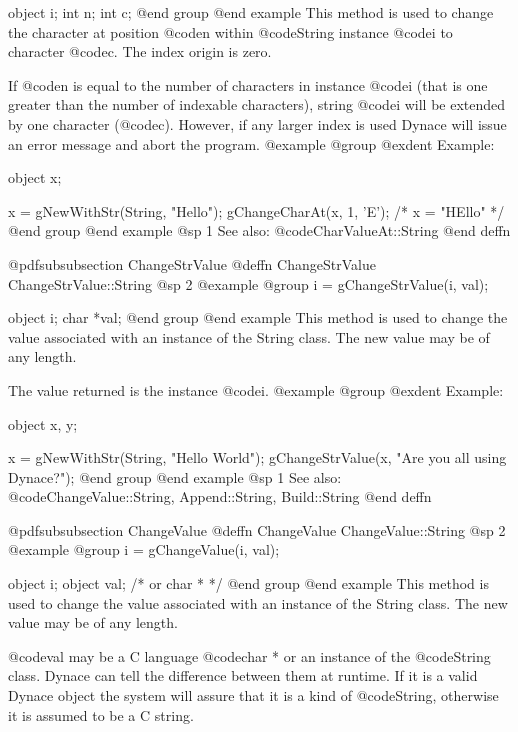 object  i;
int     n;
int     c;
@end group
@end example
This method is used to change the character at position @code{n} within
@code{String} instance @code{i} to character @code{c}.  The index origin
is zero.

If @code{n} is equal to the number of characters in instance @code{i}
(that is one greater than the number of indexable characters), string
@code{i} will be extended by one character (@code{c}).  However, if any
larger index is used Dynace will issue an error message and abort the
program.
@example
@group
@exdent Example:

object  x;

x = gNewWithStr(String, "Hello");
gChangeCharAt(x, 1, 'E');
/*  x = "HEllo"  */
@end group
@end example
@sp 1
See also:  @code{CharValueAt::String}
@end deffn










@pdfsubsubsection {ChangeStrValue}
@deffn {ChangeStrValue} ChangeStrValue::String
@sp 2
@example
@group
i = gChangeStrValue(i, val);

object  i;
char   *val;
@end group
@end example
This method is used to change the value associated with an instance of
the String class.  The new value may be of any length.

The value returned is the instance @code{i}.
@example
@group
@exdent Example:

object  x, y;

x = gNewWithStr(String, "Hello World");
gChangeStrValue(x, "Are you all using Dynace?");
@end group
@end example
@sp 1
See also:  @code{ChangeValue::String, Append::String, Build::String}
@end deffn














@pdfsubsubsection {ChangeValue}
@deffn {ChangeValue} ChangeValue::String
@sp 2
@example
@group
i = gChangeValue(i, val);

object  i;
object  val;  /*  or char *  */
@end group
@end example
This method is used to change the value associated with an instance of
the String class.  The new value may be of any length.

@code{val} may be a C language @code{char *} or an instance of the
@code{String} class.  Dynace can tell the difference between them at
runtime.  If it is a valid Dynace object the system will assure that it is
a kind of @code{String}, otherwise it is assumed to be a C string.

